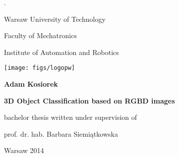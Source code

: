 \pagestyle{empty}
\color{white} . \color{black}
\vspace{0.2cm}

\begin{center}
\begin{Huge}Warsaw University of Technology
\end{Huge}
\end{center}

\begin{center}
\begin{LARGE}Faculty of Mechatronics

\vspace{0.5cm}
Institute of Automation and Robotics
\vspace{1.0cm}
\end{LARGE}
\end{center}
\begin{center}\texttt{[image: figs/logopw]}\end{center} 

\vspace{0.5cm}

\begin{center}
\begin{LARGE}\textbf{Adam Kosiorek}\end{LARGE}
\end{center}

\vspace{0.5cm}

\begin{center}
\begin{Huge}\textbf{3D Object Classification based on RGBD images}
\vspace{0.5cm}
\end{Huge}
\end{center}

\vspace{0.5cm}

\begin{center}
\begin{Large}bachelor thesis written under supervision of\end{Large}

\vspace{0.2cm}

\begin{Large}prof. dr. hab. Barbara Siemiątkowska\end{Large}
\end{center}

\vspace{1.8cm}

\begin{center}
\begin{Large}Warsaw 2014\end{Large}
\end{center}

